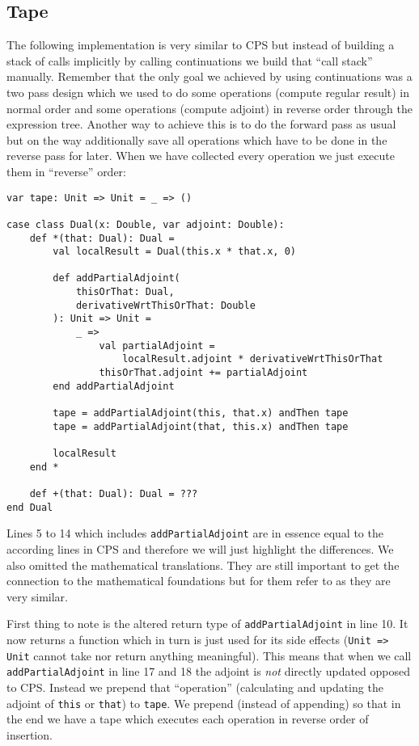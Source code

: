 \subsection{Tape} \label{sec:tape}

The following implementation is very similar to CPS but instead of building a stack of calls implicitly by calling continuations we build that ``call stack'' manually. Remember that the only goal we achieved by using continuations was a two pass design which we used to do some operations (compute regular result) in normal order and some operations (compute adjoint) in reverse order through the expression tree. Another way to achieve this is to do the forward pass as usual but on the way additionally save all operations which have to be done in the reverse pass for later. When we have collected every operation we just execute them in ``reverse'' order:
\begin{lstlisting}[mathescape=true]
var tape: Unit => Unit = _ => ()

case class Dual(x: Double, var adjoint: Double):
    def *(that: Dual): Dual =
        val localResult = Dual(this.x * that.x, 0)

        def addPartialAdjoint(
            thisOrThat: Dual,
            derivativeWrtThisOrThat: Double
        ): Unit => Unit =
            _ =>
                val partialAdjoint = 
                    localResult.adjoint * derivativeWrtThisOrThat
                thisOrThat.adjoint += partialAdjoint
        end addPartialAdjoint

        tape = addPartialAdjoint(this, that.x) andThen tape
        tape = addPartialAdjoint(that, this.x) andThen tape

        localResult
    end *

    def +(that: Dual): Dual = ???
end Dual
\end{lstlisting}
Lines 5 to 14 which includes \lstinline{addPartialAdjoint} are in essence equal to the according lines in CPS and therefore we will just highlight the differences. We also omitted the mathematical translations. They are still important to get the connection to the mathematical foundations but for them refer to  as they are very similar.

First thing to note is the altered return type of \lstinline{addPartialAdjoint} in line 10. It now returns a function which in turn is just used for its side effects (\lstinline{Unit => Unit} cannot take nor return anything meaningful). This means that when we call \lstinline{addPartialAdjoint} in line 17 and 18 the adjoint is \emph{not} directly updated opposed to CPS. Instead we prepend that ``operation'' (calculating and updating the adjoint of \lstinline{this} or \lstinline{that}) to \lstinline{tape}. We prepend (instead of appending) so that in the end we have a tape which executes each operation in reverse order of insertion.

